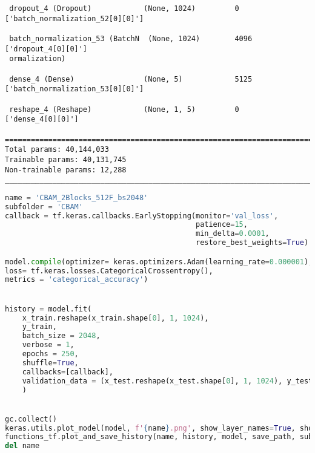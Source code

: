 \begin{lstlisting}
 dropout_4 (Dropout)            (None, 1024)         0           ['batch_normalization_52[0][0]'] 
                                                                                                  
 batch_normalization_53 (BatchN  (None, 1024)        4096        ['dropout_4[0][0]']              
 ormalization)                                                                                    
                                                                                                  
 dense_4 (Dense)                (None, 5)            5125        ['batch_normalization_53[0][0]'] 
                                                                                                  
 reshape_4 (Reshape)            (None, 1, 5)         0           ['dense_4[0][0]']                
                                                                                                  
==================================================================================================
Total params: 40,144,033
Trainable params: 40,131,745
Non-trainable params: 12,288
__________________________________________________________________________________________________
\end{lstlisting}

\begin{lstlisting}[language=Python]
name = 'CBAM_2Blocks_512F_bs2048'
subfolder = 'CBAM'
callback = tf.keras.callbacks.EarlyStopping(monitor='val_loss', 
                                            patience=15,
                                            min_delta=0.0001,
                                            restore_best_weights=True)

model.compile(optimizer= keras.optimizers.Adam(learning_rate=0.000001),
loss= tf.keras.losses.CategoricalCrossentropy(),
metrics = 'categorical_accuracy')


history = model.fit(
    x_train.reshape(x_train.shape[0], 1, 1024),
    y_train,
    batch_size = 2048,
    verbose = 1,
    epochs = 250,
    shuffle=True,
    callbacks=[callback],
    validation_data = (x_test.reshape(x_test.shape[0], 1, 1024), y_test)
    )


gc.collect()
keras.utils.plot_model(model, f'{name}.png', show_layer_names=True, show_layer_activations=True, show_shapes=True)
functions_tf.plot_and_save_history(name, history, model, save_path, subfolder=subfolder)
del name
\end{lstlisting}


